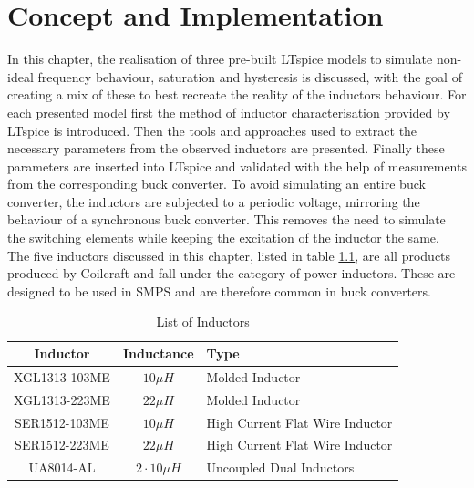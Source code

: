 
\chapter{Concept and Implementation} \label{sec:cha3}
In this chapter, the realisation of three pre-built LTspice models to simulate non-ideal frequency behaviour, saturation and hysteresis is discussed, with the goal of creating a mix of these to best recreate the reality of the inductors behaviour. For each presented model first the method of inductor characterisation provided by LTspice is introduced. Then the tools and approaches used to extract the necessary parameters from the observed inductors are presented. Finally these parameters are inserted into LTspice and validated with the help of measurements from the corresponding buck converter. To avoid simulating an entire buck converter, the inductors are subjected to a periodic voltage, mirroring the behaviour of a synchronous buck converter. This removes the need to simulate the switching elements while keeping the excitation of the inductor the same. \\
The five inductors discussed in this chapter, listed in table \ref{tab:list_of_inductors}, are all products produced by Coilcraft and fall under the category of power inductors. These are designed to be used in SMPS and are therefore common in buck converters. 
\begin{table}[H]
    \centering
    \caption{List of Inductors}
    \begin{tabular}{|c|c|l|}
    \hline
    Inductor &  Inductance & Type \\
    \hline
     XGL1313-103ME & $10 \mu H$ & Molded Inductor \\
        XGL1313-223ME & $22 \mu H$ & Molded Inductor \\
        SER1512-103ME & $10 \mu H$ & High Current Flat Wire Inductor \\
        SER1512-223ME & $22 \mu H$ & High Current Flat Wire Inductor \\
        UA8014-AL & $2 \cdot 10 \mu H$ & Uncoupled Dual Inductors \\
    \hline
    \end{tabular}
    \label{tab:list_of_inductors}
\end{table}

